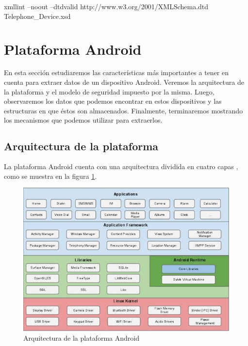 \begin{bash}
xmllint --noout --dtdvalid http://www.w3.org/2001/XMLSchema.dtd Telephone_Device.xsd
\end{bash}

\section{Plataforma Android}
En esta sección estudiaremos las características más importantes a tener en cuenta para extraer datos de un dispositivo Android. Veremos la arquitectura de la plataforma y el modelo de seguridad impuesto por la misma. Luego, observaremos los datos que podemos encontrar en estos dispositivos y las estructuras en que éstos son almacenados. Finalmente, terminaremos mostrando los mecanismos que podemos utilizar para extraerlos.

\subsection{Arquitectura de la plataforma}
La plataforma Android cuenta con una arquitectura dividida en cuatro capas \cite{androidArch}, como se muestra en la figura \ref{arquitecturaDeAndroid}.

\begin{figure}[t]
    \begin{center}
        \includegraphics[scale=0.6]{figures/android_architecture}
        \caption{Arquitectura de la plataforma Android \cite{androidSoftwareStack}}
        \label{arquitecturaDeAndroid}
    \end{center}
\end{figure}

